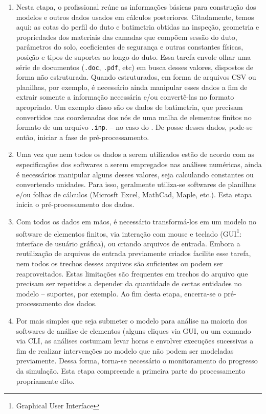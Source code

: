 \begin{enumerate}[label=(\arabic*)]
    \item Nesta etapa, o profissional reúne as informações básicas para construção dos modelos e outros dados usados em cálculos posteriores. Citadamente, temos aqui: as cotas do perfil do duto e batimetria obtidas na inspeção, geometria e propriedades dos materiais das camadas que compõem sessão do duto, parâmetros do solo, coeficientes de segurança e outras constantes físicas, posição e tipos de suportes ao longo do duto. Essa tarefa envole olhar uma série de documentos (\texttt{.doc}, \texttt{.pdf}, etc) em busca desses valores, dispostos de forma não estruturada. Quando estruturados, em forma de arquivos CSV ou planilhas, por exemplo, é necessário ainda manipular esses dados a fim de extrair somente a informação necessária e/ou convertê-las no formato apropriado. Um exemplo disso são os dados de batimetria, que precisam convertidos nas coordenadas dos nós de uma malha de elementos finitos no formato de um arquivo \texttt{.inp}. -- no caso do \abaqus. De posse desses dados, pode-se então, iniciar a fase de pré-processamento.
    \item Uma vez que nem todos os dados a serem utilizados estão de acordo com as especificações dos softwares a serem empregados nas análises numéricas, ainda é necessários manipular alguns desses valores, seja calculando constantes ou convertendo unidades. Para isso, geralmente utiliza-se softwares de planilhas e/ou folhas de cálculos (Microsft Excel, MathCad, Maple, etc.). Esta etapa inicia o pré-processamento dos dados.
    \item Com todos os dados em mãos, é necessário transformá-los em um modelo no software de elementos finitos, via interação com mouse e teclado (GUI\footnote{\textit{}{Graphical User Interface}}: interface de usuário gráfica), ou criando arquivos de entrada. Embora a reutilização de arquivos de entrada previamente criados facilite esse tarefa, nem todos os trechos desses arquivos são suficientes ou podem ser reaproveitados. Estas limitações são frequentes em trechos do arquivo que precisam ser repetidos a depender da quantidade de certas entidades no modelo -- suportes, por exemplo. Ao fim desta etapa, encerra-se o pré-processamento dos dados.
    \item Por mais simples que seja submeter o modelo para análise na maioria dos softwares de análise de elementos (alguns cliques via GUI, ou um comando via CLI, as análises costumam levar horas e envolver execuções sucessivas a fim de realizar intervenções no modelo que não podem ser modeladas previamente. Dessa forma, torna-se necessário o monitoramento do progresso da simulação. Esta etapa compreende a primeira parte do processamento propriamente dito.

\end{enumerate}
